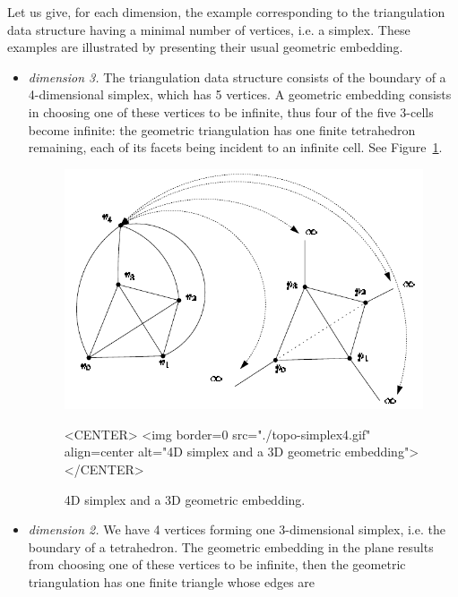 Let us give, for each dimension, the example corresponding to the
triangulation data structure having a minimal number of vertices, i.e. a 
simplex. These examples are illustrated by presenting their usual
geometric embedding. 
\begin{itemize}
\item \emph{dimension 3.} The triangulation data structure consists of
the boundary of a 4-dimensional simplex, which has 5 vertices. A
geometric embedding consists in choosing one of these vertices to be
infinite, thus four of the five 3-cells become infinite: the geometric
triangulation has one finite tetrahedron remaining, each of its facets
being incident to an infinite cell. See Figure~\ref{TDS3-fig-topo-simplex4}.
\begin{figure}
\begin{ccTexOnly}
\begin{center} 
\includegraphics{TriangulationDS_3/topo-simplex4}
\end{center}
\end{ccTexOnly}
\caption{4D simplex and a 3D geometric embedding.
\label{TDS3-fig-topo-simplex4}}
\begin{ccHtmlOnly}
<CENTER>
<img border=0 src="./topo-simplex4.gif" align=center
alt="4D simplex and a 3D geometric embedding">
</CENTER>
\end{ccHtmlOnly}
\end{figure} 
\item \emph{dimension 2.} We have 4 vertices forming one 3-dimensional
simplex, i.e. the boundary of a tetrahedron. The geometric embedding in
the plane results from choosing one of these vertices to be infinite,
then the geometric triangulation has one finite triangle whose edges are

\end{itemize}
